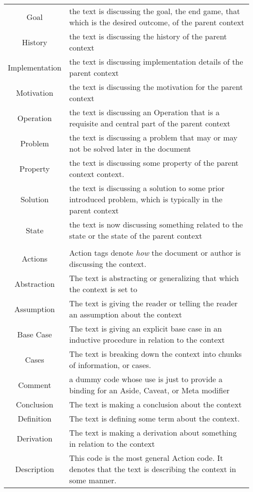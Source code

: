 \begin{table}[h!]
\begin{tabular}{c p{1.8\linewidth}}
    Goal & the text is discussing the goal, the end game, that which is the desired outcome, of the parent context\\
    History & the text is discussing the history of the parent context\\
    Implementation & the text is discussing implementation details of the parent context\\
    Motivation & the text is discussing the motivation for the parent context\\
    Operation & the text is discussing an Operation that is a requisite and central part of the parent context\\
    Problem & the text is discussing a problem that may or may not be solved later in the document\\
    Property & the text is discussing some property of the parent context context.\\
    Solution & the text is discussing a solution to some prior introduced problem, which is typically in the parent context\\
    State & the text is now discussing something related to the state or the state of the parent context\\
\\
    Actions & Action tags denote \emph{how} the document or author is discussing the context.\\
    \hline
    Abstraction & The text is abstracting or generalizing that which the context is set to\\
    Assumption & The text is giving the reader or telling the reader an assumption about the context \\
    Base Case & The text is giving an explicit base case in an inductive procedure in relation to the context\\
    Cases & The text is breaking down the context into chunks of information, or cases.\\
    Comment & a dummy code whose use is just to provide a binding for an Aside, Caveat, or Meta modifier\\
    Conclusion & The text is making a conclusion about the context\\
    Definition & The text is defining some term about the context.\\
    Derivation & The text is making a derivation about something in relation to the context\\
    Description & This code is the most general Action code. It denotes that the text is describing the context in some manner.\\

\end{tabular}
\end{table}
